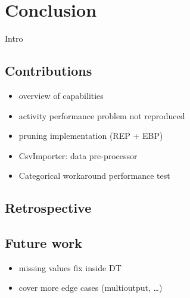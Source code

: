 \chapter{Conclusion}\label{cha:conclusion}
Intro

\section{Contributions}
\begin{itemize}
    \item overview of capabilities
    \item activity performance problem not reproduced
    \item pruning implementation (REP + EBP)
    \item CsvImporter: data pre-processor
    \item Categorical workaround performance test
\end{itemize}

\section{Retrospective}
\section{Future work}
\begin{itemize}
    \item missing values fix inside DT
    \item cover more edge cases (multioutput, \ldots)
\end{itemize}
